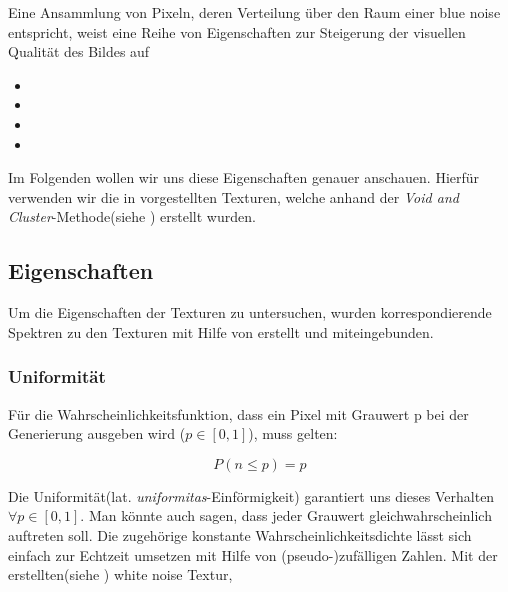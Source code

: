 Eine Ansammlung von Pixeln, deren Verteilung über den Raum einer blue noise entspricht, 
weist eine Reihe von Eigenschaften zur Steigerung der visuellen Qualität des Bildes auf \cite{3288}

\begin{itemize}

    \item {}
    \item {}
    \item {}
    \item {}

\end{itemize}

Im Folgenden wollen wir uns diese Eigenschaften genauer anschauen.
Hierfür verwenden wir die in \cite{Pet17} vorgestellten Texturen, welche anhand der
\textit{Void and Cluster}-Methode(siehe \cite{ulichney1993void}) erstellt wurden.

\subsection{Eigenschaften}

Um die Eigenschaften der Texturen zu untersuchen, wurden korrespondierende Spektren zu den Texturen mit Hilfe von 
\cite{JCrystalSoft2018} erstellt und miteingebunden.

\subsubsection{Uniformität}
\label{ch:Content1:sec:blue noise:Uniformität}

Für die Wahrscheinlichkeitsfunktion, dass
ein Pixel mit Grauwert p bei der Generierung ausgeben wird  ($\textit{p} \in [0,1]$), muss gelten: 

\begin{equation}\label{eq:Uniformitätsgleichung}
    P(n \leq p) = p
\end{equation}

Die Uniformität(lat. \textit{uniformitas}-Einförmigkeit) garantiert uns dieses
Verhalten $\forall p \in [0,1]$. Man könnte auch sagen, dass jeder Grauwert gleichwahrscheinlich
auftreten soll. Die zugehörige konstante Wahrscheinlichkeitsdichte
lässt sich einfach zur Echtzeit umsetzen mit Hilfe von (pseudo-)zufälligen Zahlen.
Mit der erstellten(siehe \cite{WhiteNoiseGenerator}) white noise Textur,

